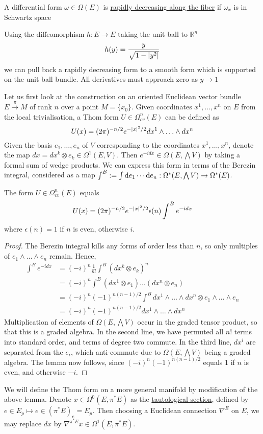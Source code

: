 \begin{defn}
	A differential form $\omega\in \Omega(E)$ is \underline{rapidly decreasing
	along the fiber} if  $\omega_x$ is in Schwartz space
\end{defn}

Using the diffeomorphism $h : E \to E$ taking the unit ball to $\mathbb{R}^n$
\[
	h(y) = \frac{y}{\sqrt{1-\abs{y^2}} }
\] 
we can pull back a rapidly decreasing form to a smooth form which is supported
on the unit ball bundle. 
All derivatives must approach zero as $y \to 1$


Let us first look at the construction on an oriented Euclidean vector bundle
$E\xrightarrow{\pi} M$ of rank $n$ over a point $M=\{x_0\}$. 
Given coordinates $x^1,\ldots,x^n$ on $E$ from the local trivialisation,
a Thom form $U\in \Omega^n_{cv}(E)$ can be defined as
\[
	U(x) = (2\pi)^{-n/2}e^{-\abs{x}^2 /2} dx^1\wedge \ldots\wedge dx^n
\] 
Given the basis $e_1,\ldots,e_n$ of  $V$ corresponding to the coordinates
$x^1,\ldots,x^n$, denote the map $dx = dx^k \otimes e_k \in 
\Omega^1(E, V)$. Then $e^{-idx}\in \Omega(E,\bigwedge V)$ by taking a formal sum
of wedge products.
We can express this form in terms of the Berezin integral,
considered as a map $\int^B := \int \odif{e_1}\cdots\odif{e_n} 
: \Omega^*(E,\bigwedge V) \to \Omega^*(E)$.

\begin{lem} \label{lem:gaussian_integral} %
	The form $U\in \Omega^n_{cv}(E)$ equals 
	\[
		 U(x) = (2\pi)^{-n/2} e^{-\abs{x}^2 /2} \epsilon(n)\int^B e^{-idx}
	\] 
	where $\epsilon(n)=1$ if  $n$ is even, otherwise  $i$.
\end{lem}
\begin{proof}
	The Berezin integral kills any forms of order less than $n$, so only
	multiples of $e_1 \wedge \ldots\wedge e_n$ remain.
	Hence,
	\begin{align*}
		\int^B e^{-idx} 
		&= (-i)^n \frac{1}{n!}\int^B (dx^k\otimes e_k)^n \\
		&= (-i)^n \int^B (dx^1\otimes e_1) \ldots(dx^n\otimes e_n) \\
		&= (-i)^n(-1)^{n(n-1)/2} \int^B dx^1\wedge \ldots\wedge dx^n\otimes e_1 \wedge\ldots\wedge e_n \\
		&= (-i)^n(-1)^{n(n-1)/2} dx^1\wedge \ldots\wedge dx^n
	\end{align*}
	Multiplication of elements of $\Omega(E,\bigwedge V)$ occur in
	the graded tensor product, so that this is a graded algebra. 
	In the second line, we have permuted all $n!$ terms into standard order, and
	terms of degree two commute.
	In the third line, $dx^i$ are separated from the  $e_i$, which
	anti-commute due to  $\Omega(E,\bigwedge V)$ being a graded algebra. 
	The lemma now follows, since
	$(-i)^n(-1)^{n(n-1)/2}$ equals 1 if $n$ is even, and otherwise  $-i$. 
\end{proof}
We will define the Thom form on a more general manifold by modification of the
above lemma. Denote $x \in \Omega^0(E,\pi^*E)$ as the \underline{tautological
section}, defined by $e\in E_p \mapsto e\in (\pi^*E)_{e} = E_{p}$.
Then choosing a Euclidean connection $\nabla^E$ on  $E$, we may replace  $dx$ by 
$\nabla^{\pi^*E} x \in \Omega^1(E,\pi^*E)$.

